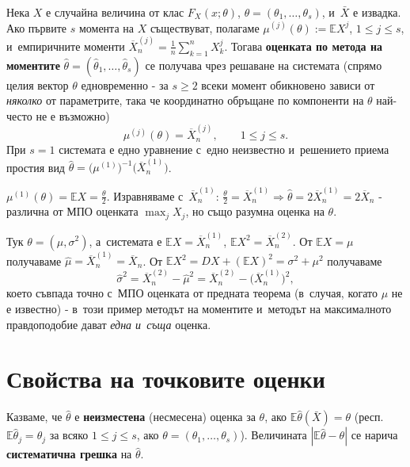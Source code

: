 \begin{defbox}
Нека $X$ е случайна величина от клас $F_X(x;\theta)$, $\theta=
(\theta_1,\dots,\theta_s)$, и~$\bar X$ е извадка. Ако първите $s$
момента на $X$ съществуват, полагаме $\mu^{(j)}(\theta):=\mathbb
EX^j$, $1\le j\le s$, и~емпиричните моменти $\overline
X_n^{(j)}=\tfrac1n\sum_{k=1}^n X_k^j$. Тогава \textbf{оценката по
метода на моментите} $\hat\theta=(\hat\theta_1,\dots,\hat\theta_s)$
се получава чрез решаване на системата (спрямо целия вектор
$\theta$ едновременно - за $s\ge2$ всеки момент обикновено зависи от
\emph{няколко} от параметрите, така че координатно обръщане по
компоненти на $\theta$ най-често не е възможно)
\[
  \mu^{(j)}(\theta) = \overline X_n^{(j)}, \qquad 1\le j\le s.
\]
При $s=1$ системата е едно уравнение с~едно неизвестно и~решението
приема простия вид $\hat\theta = \big(\mu^{(1)}\big)^{-1}\big(\overline
X_n^{(1)}\big)$.
\end{defbox}

\begin{rembox}
$\mu^{(1)}(\theta)=\mathbb EX=\tfrac\theta2$. Изравняваме с~$\overline X_n^{(1)}$: $\tfrac\theta2=\overline X_n^{(1)}
\Rightarrow \hat\theta = 2\overline X_n^{(1)} = 2\overline X_n$ -
различна от МПО оценката $\max_j X_j$, но също разумна оценка на
$\theta$.
\end{rembox}

\begin{rembox}
Тук $\theta=(\mu,\sigma^2)$, а~системата е $\mathbb EX=\overline
X_n^{(1)}$, $\mathbb EX^2=\overline X_n^{(2)}$. От $\mathbb EX=\mu$
получаваме $\hat\mu=\overline X_n^{(1)}=\overline X_n$. От
$\mathbb EX^2 = DX+(\mathbb EX)^2=\sigma^2+\mu^2$ получаваме
\[
  \hat\sigma^2 = \overline X_n^{(2)} - \hat\mu^2 = \overline X_n^{(2)} - \big(\overline X_n^{(1)}\big)^2,
\]
което съвпада точно с~МПО оценката от предната теорема (в~случая,
когато $\mu$ не е известно) - в~този пример методът на моментите и~методът на максималното правдоподобие дават \emph{една и~съща}
оценка.
\end{rembox}

\section{Свойства на точковите оценки}

\begin{defbox}[~(Неизместеност)]
Казваме, че $\hat\theta$ е \textbf{неизместена} (несмесена) оценка
за $\theta$, ако $\mathbb E\hat\theta(\bar X) = \theta$ (респ.\
$\mathbb E\hat\theta_j = \theta_j$ за всяко $1\le j\le s$, ако
$\theta=(\theta_1,\dots,\theta_s)$). Величината $|\mathbb E\hat\theta
-\theta|$ се нарича \textbf{систематична грешка} на $\hat\theta$.
\end{defbox}

